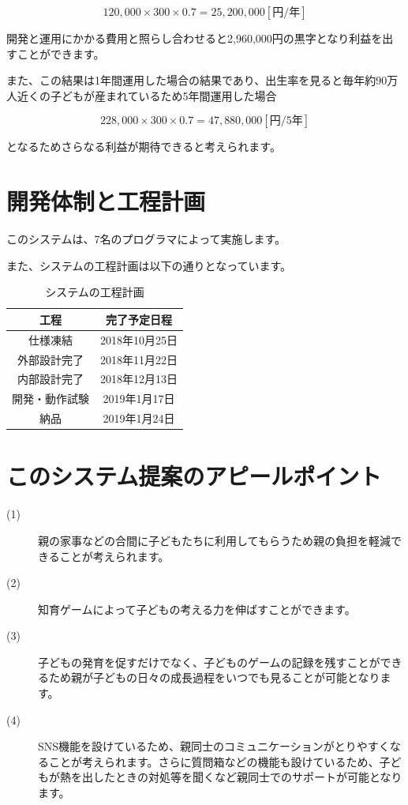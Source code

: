 \documentclass[a4j]{jarticle}
\begin{document}
\begin{equation}
  120,000×300×0.7 = 25,200,000 [円/年]
\end{equation}

開発と運用にかかる費用と照らし合わせると2,960,000円の黒字となり利益を出すことができます。\par
また、この結果は1年間運用した場合の結果であり、出生率を見ると毎年約90万人近くの子どもが産まれているため5年間運用した場合

\begin{equation}
  228,000×300×0.7 = 47,880,000　[円/5年]
\end{equation}

となるためさらなる利益が期待できると考えられます。



\section{開発体制と工程計画}
このシステムは、7名のプログラマによって実施します。\par
また、システムの工程計画は以下の通りとなっています。

\begin{table}[!h]
  \centering
  \caption{システムの工程計画}
  \begin{tabular}{|c|c|}
    \hline
    \multicolumn{1}{|c|}{工程} & \multicolumn{1}{c|}{完了予定日程} \\ \hline \hline
    仕様凍結 & 2018年10月25日  \\ \hline
    外部設計完了 & 2018年11月22日  \\ \hline
    内部設計完了 & 2018年12月13日 \\ \hline
    開発・動作試験 & 2019年1月17日  \\ \hline
    納品 & 2019年1月24日  \\ \hline
  \end{tabular}
\end{table}


\section{このシステム提案のアピールポイント}
\begin{description}
\item[(1)] 親の家事などの合間に子どもたちに利用してもらうため親の負担を軽減できることが考えられます。
\item[(2)] 知育ゲームによって子どもの考える力を伸ばすことができます。
  
\item[(3)] 子どもの発育を促すだけでなく、子どものゲームの記録を残すことができるため親が子どもの日々の成長過程をいつでも見ることが可能となります。
\item[(4)] SNS機能を設けているため、親同士のコミュニケーションがとりやすくなることが考えられます。さらに質問箱などの機能も設けているため、子どもが熱を出したときの対処等を聞くなど親同士でのサポートが可能となります。
\end{description}
\end{document}
